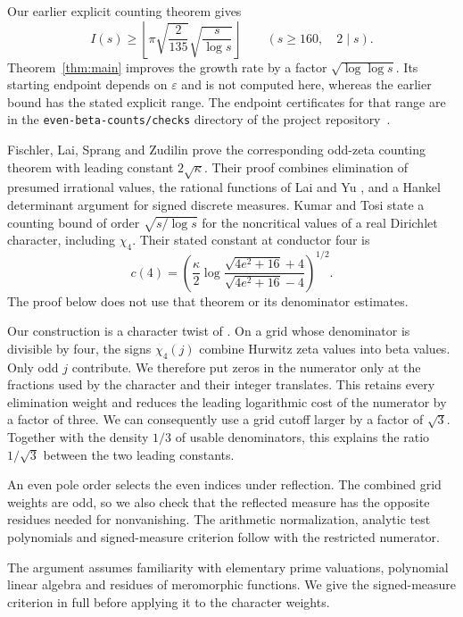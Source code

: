 \documentclass[11pt]{article}
\theoremstyle{remark}
\numberwithin{equation}{section}
\begin{document}
Our earlier explicit counting theorem \cite[Theorem~1.1]{THcount} gives
\[
 I(s)\geq\left\lfloor\pi\sqrt{\frac{2}{135}}
                      \sqrt{\frac{s}{\log s}}\right\rfloor
 \qquad(s\geq160,\quad 2\mid s).
\]
Theorem~\ref{thm:main} improves the growth rate by a factor
$\sqrt{\log\log s}$. Its starting endpoint depends on $\varepsilon$
and is not computed here, whereas the earlier bound has the stated
explicit range. The endpoint certificates for that range are in the
\texttt{even-beta-counts/checks} directory of the project repository~\cite{beta4repo}.

Fischler, Lai, Sprang and Zudilin \cite[Theorem~1.1]{FLSZ} prove the
corresponding odd-zeta counting theorem with leading constant
$2\sqrt\kappa$. Their proof combines elimination of presumed irrational
values, the rational functions of Lai and Yu \cite{LY}, and a Hankel
determinant argument for signed discrete measures. Kumar and Tosi
\cite[Theorem~1]{KT} state a counting bound of order $\sqrt{s/\log s}$
for the noncritical values of a real Dirichlet character, including
$\chi_4$. Their stated constant at conductor four is
\[
 c(4)=\left(\frac{\kappa}{2}
  \log\frac{\sqrt{4e^2+16}+4}{\sqrt{4e^2+16}-4}\right)^{1/2}.
\]
The proof below does not use that theorem or its denominator estimates.

Our construction is a character twist of \cite[Sections~2--6]{FLSZ}.
On a grid whose denominator is divisible by four, the signs $\chi_4(j)$
combine Hurwitz zeta values into beta values. Only odd $j$ contribute.
We therefore put zeros in the numerator only at the fractions used by
the character and their integer translates. This retains every elimination
weight and reduces the leading logarithmic cost of the numerator by a
factor of three. We can consequently use a grid cutoff larger by a
factor of $\sqrt3$. Together with the density $1/3$ of usable denominators,
this explains the ratio $1/\sqrt3$ between the two leading constants.

An even pole order selects the even indices under reflection. The
combined grid weights are odd, so we also check that the reflected
measure has the opposite residues needed for nonvanishing. The
arithmetic normalization, analytic test polynomials and signed-measure
criterion follow \cite{FLSZ} with the restricted numerator.

The argument assumes familiarity with elementary prime valuations,
polynomial linear algebra and residues of meromorphic functions. We give
the signed-measure criterion in full before applying it to the character
weights.
\end{document}
